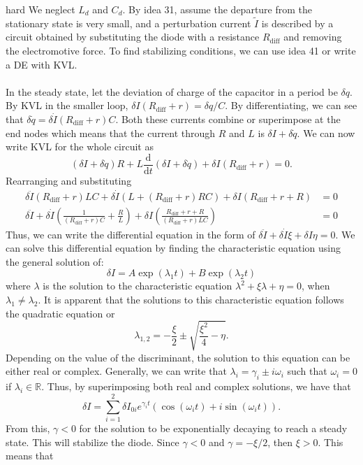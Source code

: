 \begin{solution}{hard}
We neglect $L_d$ and $C_d$. By idea 31, assume the departure from the stationary state is very small, and a perturbation current $\widetilde{I}$ is described by a circuit obtained by substituting the diode with a resistance $R_{\text{diff}}$ and removing the electromotive force. To find stabilizing conditions, we can use idea 41 or write a DE with KVL. 
\\
\\
In the steady state, let the deviation of charge of the capacitor in a period be $\delta q$. By KVL in the smaller loop, $\delta I (R_{\text{diff}} + r) = \delta q/C$. By differentiating, we can see that $\delta \dot q = \delta \dot I (R_{\text{diff}} + r)C$. Both these currents combine or superimpose at the end nodes which means that the current through $R$ and $L$ is $\delta I + \delta \dot q$. We can now write KVL for the whole circuit as 
\[(\delta I + \delta \dot q) R + L \frac{\text{d}}{\text{d}t}\left( \delta I + \delta \dot q\right) + \delta I (R_{\text{diff}} + r) = 0.\]
Rearranging and substituting 
\begin{align*}\delta \ddot I(R_{\text{diff}} + r)LC + \delta \dot I\left(L +  (R_{\text{diff}} + r)RC\right) + \delta I(R_{\text{diff}} + r + R) &= 0 \\
\delta \ddot I + \delta \dot I \left(\frac{1}{(R_{\text{diff}} + r)C} + \frac{R}{L}\right) + \delta I \left(\frac{R_{\text{diff}} + r + R}{(R_{\text{diff}} + r)LC}\right) &= 0 
\end{align*}
Thus, we can write the differential equation in the form of $\delta \ddot I + \delta \dot I \xi + \delta I \eta = 0$. We can solve this differential equation by finding the characteristic equation using the general solution of:
\[\delta I = A \exp (\lambda_1 t) + B \exp (\lambda_2 t)\]
where $\lambda$ is the solution to the characteristic equation $\lambda^2 + \xi \lambda + \eta = 0$, when $\lambda_1 \neq \lambda_2$. It is apparent that the solutions to this characteristic equation follows the quadratic equation or 
\[\lambda_{1, 2} = -\frac{\xi}{2} \pm \sqrt{\frac{\xi^2}{4} - \eta}.\]
Depending on the value of the discriminant, the solution to this equation can be either real or complex. Generally, we can write that $\lambda_i = \gamma_i \pm i\omega_i$ such that $\omega_i = 0$ if $\lambda_i \in \mathbb R$. Thus, by superimposing both real and complex solutions, we have that 
\[\delta I = \sum_{i = 1}^{2} \delta I_{0i} e^{\gamma_i t} \left( \cos (\omega_i t) + i\sin (\omega_i t)\right).\]
From this, $\gamma < 0$ for the solution to be exponentially decaying to reach a steady state. This will stabilize the diode. Since $\gamma < 0$ and $\gamma = -\xi/2$, then $\xi > 0$. This means that 

\end{solution}
